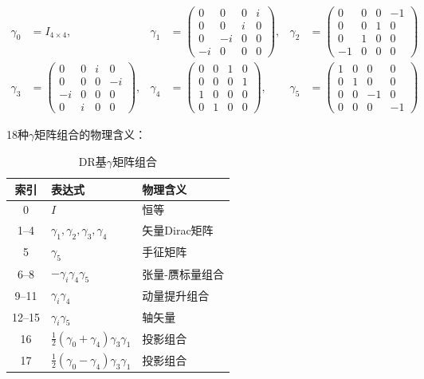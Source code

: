 \documentclass[11pt,a4paper]{ctexart}
\begin{document}
\begin{physicsbox}
\begin{align}
\gamma_0 &= I_{4\times 4}, &
\gamma_1 &= \begin{pmatrix} 0 & 0 & 0 & i \\ 0 & 0 & i & 0 \\ 0 & -i & 0 & 0 \\ -i & 0 & 0 & 0 \end{pmatrix}, &
\gamma_2 &= \begin{pmatrix} 0 & 0 & 0 & -1 \\ 0 & 0 & 1 & 0 \\ 0 & 1 & 0 & 0 \\ -1 & 0 & 0 & 0 \end{pmatrix} \\
\gamma_3 &= \begin{pmatrix} 0 & 0 & i & 0 \\ 0 & 0 & 0 & -i \\ -i & 0 & 0 & 0 \\ 0 & i & 0 & 0 \end{pmatrix}, &
\gamma_4 &= \begin{pmatrix} 0 & 0 & 1 & 0 \\ 0 & 0 & 0 & 1 \\ 1 & 0 & 0 & 0 \\ 0 & 1 & 0 & 0 \end{pmatrix}, &
\gamma_5 &= \begin{pmatrix} 1 & 0 & 0 & 0 \\ 0 & 1 & 0 & 0 \\ 0 & 0 & -1 & 0 \\ 0 & 0 & 0 & -1 \end{pmatrix}
\end{align}
\end{physicsbox}

18种$\gamma$矩阵组合的物理含义：

\begin{table}[h]
\centering
\begin{tabular}{@{}cll@{}}
\toprule
索引 & 表达式 & 物理含义 \\
\midrule
0 & $I$ & 恒等 \\
1--4 & $\gamma_1, \gamma_2, \gamma_3, \gamma_4$ & 矢量Dirac矩阵 \\
5 & $\gamma_5$ & 手征矩阵 \\
6--8 & $-\gamma_i \gamma_4 \gamma_5$ & 张量-赝标量组合 \\
9--11 & $\gamma_i \gamma_4$ & 动量提升组合 \\
12--15 & $\gamma_i \gamma_5$ & 轴矢量 \\
16 & $\frac{1}{2}(\gamma_0+\gamma_4)\gamma_3\gamma_1$ & 投影组合 \\
17 & $\frac{1}{2}(\gamma_0-\gamma_4)\gamma_3\gamma_1$ & 投影组合 \\
\bottomrule
\end{tabular}
\caption{DR基$\gamma$矩阵组合}
\end{table}
\end{document}
